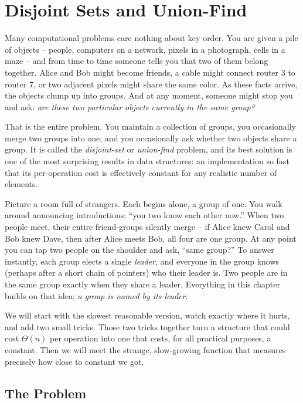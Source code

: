 \chapter{Disjoint Sets and Union-Find}

Many computational problems care nothing about key order. You are given a pile of objects -- people, computers on a network,
pixels in a photograph, cells in a maze -- and from time to time someone tells
you that two of them belong together. Alice and Bob might become friends, a
cable might connect router 3 to router 7, or two adjacent pixels might share
the same color. As these facts arrive, the objects clump up into groups. And
at any moment, someone might stop you and ask: \emph{are these two particular
objects currently in the same group?}

That is the entire problem. You maintain a collection of groups, you
occasionally merge two groups into one, and you occasionally ask whether two
objects share a group. It is called the \emph{disjoint-set} or
\emph{union-find} problem, and its best solution is one of the most surprising
results in data structures: an implementation so fast that its
per-operation cost is effectively constant for any realistic number of elements.

\begin{intuitionbox}
Picture a room full of strangers. Each begins alone, a group of one. You
walk around announcing introductions: ``you two know each other now.'' When
two people meet, their entire friend-groups silently merge -- if Alice knew
Carol and Bob knew Dave, then after Alice meets Bob, all four are one group.
At any point you can tap two people on the shoulder and ask, ``same group?'' To
answer instantly, each group elects a single \emph{leader}, and everyone in
the group knows (perhaps after a short chain of pointers) who their leader is.
Two people are in the same group exactly when they share a leader. Everything in
this chapter builds on that idea: \emph{a group is named by its leader}.
\end{intuitionbox}

We will start with the slowest reasonable version, watch exactly where it
hurts, and add two small tricks. Those two tricks together turn a structure
that could cost $\Theta(n)$ per operation into one that costs, for all
practical purposes, a constant. Then we will meet the strange, slow-growing
function that measures precisely how close to constant we got.

\section{The Problem}
\label{ch19:problem}

